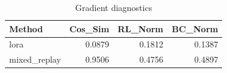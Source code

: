 \begin{table}[htbp]
\centering
\caption{Gradient diagnostics}
\label{tab:grad-diag}
\begin{tabular}{lrrr}
\toprule
\textbf{Method} & \textbf{Cos\_Sim} & \textbf{RL\_Norm} & \textbf{BC\_Norm} \\
\midrule
lora & 0.0879 & 0.1812 & 0.1387 \\
mixed\_replay & 0.9506 & 0.4756 & 0.4897 \\
\bottomrule
\end{tabular}
\end{table}